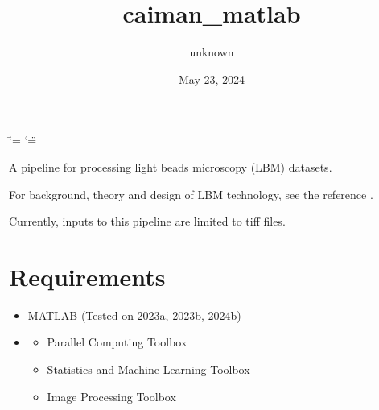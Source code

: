\documentclass[letterpaper,10pt,english]{sphinxmanual}
\title{caiman\_matlab}
\date{May 23, 2024}
\author{unknown}
\begin{document}
\ifdefined\shorthandoff
  \ifnum\catcode`\=\string=\active\shorthandoff{=}\fi
  \ifnum\catcode`\"=\active{}\fi
\fi

\pagestyle{empty}
\sphinxmaketitle
\pagestyle{plain}
\sphinxtableofcontents
\pagestyle{normal}
\label{\detokenize{index::doc}}



\sphinxAtStartPar
A pipeline for processing light beads microscopy (LBM) datasets.

\sphinxAtStartPar
For background, theory and design of LBM technology, see the reference .

\sphinxAtStartPar
Currently, inputs to this pipeline are limited to  tiff files.


\chapter{Requirements}
\label{\detokenize{index:requirements}}\begin{itemize}
\item {} 
\sphinxAtStartPar
MATLAB (Tested on 2023a, 2023b, 2024b)

\item {} \begin{description}
\begin{itemize}
\item {} 
\sphinxAtStartPar
Parallel Computing Toolbox

\item {} 
\sphinxAtStartPar
Statistics and Machine Learning Toolbox

\item {} 
\sphinxAtStartPar
Image Processing Toolbox

\end{itemize}

\end{description}

\end{itemize}
\end{document}
